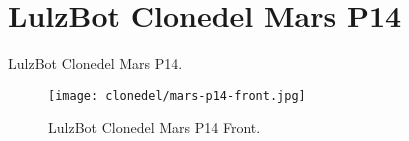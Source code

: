 %
%
%
%
%

\section{LulzBot Clonedel Mars P14}
LulzBot Clonedel Mars P14.

\begin{figure}[h!]
\texttt{[image: clonedel/mars-p14-front.jpg]}
 \caption{LulzBot Clonedel Mars P14 Front.}
 \label{fig:clonedel-mars-p14-front}
\end{figure}


